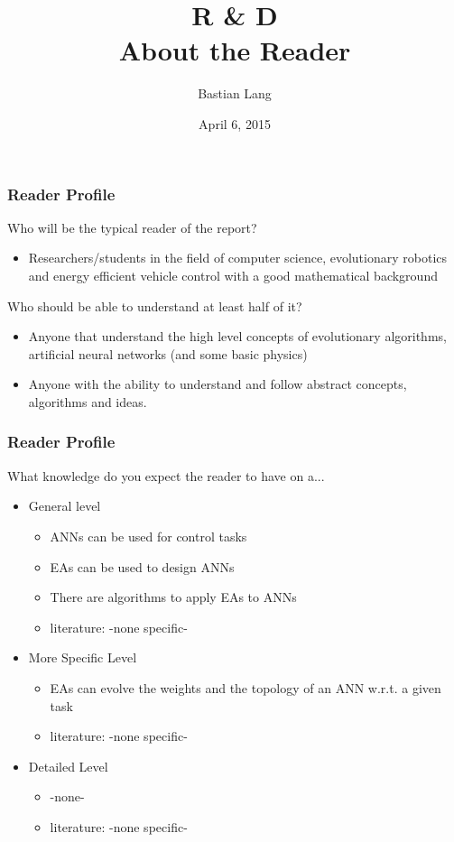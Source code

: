\documentclass[8pt]{beamer}
\title[R \& D]{R \& D\\About the Reader} %
\author{Bastian Lang} %
\institute[BRSU] %
{
Master of Autonomous Systems \\ %
}
\date{April 6, 2015}
\begin{document}
\listoffigures
\begin{frame}
\titlepage 
\end{frame}


\begin{frame}
	\frametitle{Reader Profile}
	Who will be the typical reader of the report?
	\begin{itemize}
		\item Researchers/students in the field of computer science, evolutionary robotics and energy efficient vehicle control with a good mathematical background
	\end{itemize}
	Who should be able to understand at least half of it?
	\begin{itemize}
		\item Anyone that understand the high level concepts of evolutionary algorithms, artificial neural networks (and some basic physics)
		\item Anyone with the ability to understand and follow abstract concepts, algorithms and ideas.
	\end{itemize}
\end{frame}

\begin{frame}
	\frametitle{Reader Profile}
	What knowledge do you expect the reader to have on a...
	\begin{itemize}
		\item General level
		\begin{itemize}
			\item ANNs can be used for control tasks
			\item EAs can be used to design ANNs
			\item There are algorithms to apply EAs to ANNs
			\item literature: -none specific-
		\end{itemize}
		
		\item More Specific Level
		\begin{itemize}
			\item EAs can evolve the weights and the topology of an ANN w.r.t. a given task
			\item literature: -none specific-
		\end{itemize}
		\item Detailed Level
		\begin{itemize}
			\item -none-
			\item literature: -none specific-
		\end{itemize}
	\end{itemize}
\end{frame}
\end{document}
